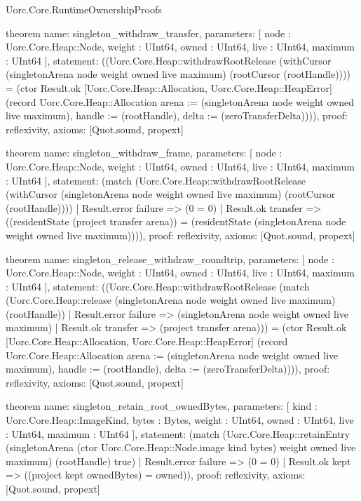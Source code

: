 \begin{lexlean}{Uorc.Core.RuntimeOwnershipProofs}
\begin{semanticmodule}
theorem{
  name: singleton_withdraw_transfer,
  parameters: [
    node : Uorc.Core.Heap::Node,
    weight : UInt64,
    owned : UInt64,
    live : UInt64,
    maximum : UInt64
  ],
  statement: ((Uorc.Core.Heap::withdrawRootRelease (withCursor (singletonArena node weight owned live maximum) (rootCursor (rootHandle)))) = (ctor Result.ok [Uorc.Core.Heap::Allocation, Uorc.Core.Heap::HeapError] (record Uorc.Core.Heap::Allocation {arena := (singletonArena node weight owned live maximum), handle := (rootHandle), delta := (zeroTransferDelta)}))),
  proof: reflexivity{},
  axioms: [Quot.sound, propext]
}

theorem{
  name: singleton_withdraw_frame,
  parameters: [
    node : Uorc.Core.Heap::Node,
    weight : UInt64,
    owned : UInt64,
    live : UInt64,
    maximum : UInt64
  ],
  statement: (match (Uorc.Core.Heap::withdrawRootRelease (withCursor (singletonArena node weight owned live maximum) (rootCursor (rootHandle))))
    | Result.error failure => (0 = 0)
    | Result.ok transfer => ((residentState (project transfer arena)) = (residentState (singletonArena node weight owned live maximum)))),
  proof: reflexivity{},
  axioms: [Quot.sound, propext]
}

theorem{
  name: singleton_release_withdraw_roundtrip,
  parameters: [
    node : Uorc.Core.Heap::Node,
    weight : UInt64,
    owned : UInt64,
    live : UInt64,
    maximum : UInt64
  ],
  statement: ((Uorc.Core.Heap::withdrawRootRelease (match (Uorc.Core.Heap::release (singletonArena node weight owned live maximum) (rootHandle))
    | Result.error failure => (singletonArena node weight owned live maximum)
    | Result.ok transfer => (project transfer arena))) = (ctor Result.ok [Uorc.Core.Heap::Allocation, Uorc.Core.Heap::HeapError] (record Uorc.Core.Heap::Allocation {arena := (singletonArena node weight owned live maximum), handle := (rootHandle), delta := (zeroTransferDelta)}))),
  proof: reflexivity{},
  axioms: [Quot.sound, propext]
}

theorem{
  name: singleton_retain_root_ownedBytes,
  parameters: [
    kind : Uorc.Core.Heap::ImageKind,
    bytes : Bytes,
    weight : UInt64,
    owned : UInt64,
    live : UInt64,
    maximum : UInt64
  ],
  statement: (match (Uorc.Core.Heap::retainEntry (singletonArena (ctor Uorc.Core.Heap::Node.image kind bytes) weight owned live maximum) (rootHandle) true)
    | Result.error failure => (0 = 0)
    | Result.ok kept => ((project kept ownedBytes) = owned)),
  proof: reflexivity{},
  axioms: [Quot.sound, propext]
}


\end{semanticmodule}
\end{lexlean}
